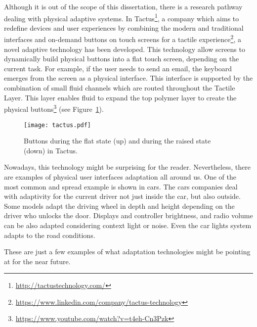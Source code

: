 Although it is out of the scope of this dissertation, there is a research
pathway dealing with physical adaptive systems. In Tactus\footnote{\url{http://tactustechnology.com/}}, a
company which aims to redefine devices and user experiences by combining the 
modern and traditional interfaces and on-demand buttons on touch
screens for a tactile experience\footnote{\url{https://www.linkedin.com/company/tactus-technology}}, a novel adaptive
technology has been developed. This technology allow screens to dynamically build
physical buttons into a flat touch screen, depending on the current task. For example,
if the user needs to send an email, the keyboard emerges from the screen
as a physical interface. This interface is supported by the combination of
small fluid channels which are routed throughout the Tactile Layer. This layer
enables fluid to expand the top polymer layer to create the physical
buttons\footnote{\url{https://www.youtube.com/watch?v=t4eh-Cn3Pzk}} (see
Figure~\ref{fig:tactus}).

\begin{figure}[H]
\centering
\texttt{[image: tactus.pdf]}
\caption{Buttons during the flat state (up) and during the raised state (down) in Tactus.}
\label{fig:tactus}
\end{figure}

Nowadays, this technology might be surprising for the reader. Nevertheless, there
are examples of physical user interfaces adaptation all around us. One of the most
common and spread example is shown in cars. The cars companies deal with adaptivity
for the current driver not just inside the car, but also outside. Some models
adapt the driving wheel in depth and height depending on the driver who unlocks
the door. Displays and controller brightness, and radio volume can be also
adapted considering context light or noise. Even the car lights system adapts
to the road conditions.

These are just a few examples of what adaptation technologies might be pointing 
at for the near future.


